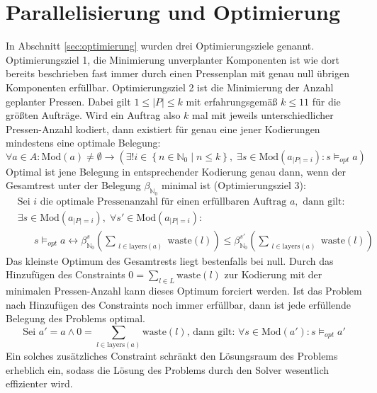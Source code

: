 \section{Parallelisierung und Optimierung}
\label{sec:parallelisierung}
In Abschnitt \ref{sec:optimierung} wurden drei Optimierungsziele genannt.
Optimierungsziel 1, die Minimierung unverplanter Komponenten ist wie dort bereits beschrieben fast immer durch einen Pressenplan mit genau null übrigen Komponenten erfüllbar.
Optimierungsziel 2 ist die Minimierung der Anzahl geplanter Pressen.
Dabei gilt $1 \leq \lvert P \rvert \leq k$ mit erfahrungsgemäß $k \leq 11$ für die größten Aufträge.
Wird ein Auftrag also $k$ mal mit jeweils unterschiedlicher Pressen-Anzahl kodiert, dann existiert für genau eine jener Kodierungen mindestens eine optimale Belegung:
\[
    \forall a \in A: \text{Mod}(a) \neq \emptyset \rightarrow (\exists! i \in \left\{ n \in \mathbb{N}_0 \mid n \leq k \right\}, \; \exists s \in \text{Mod}(a_{\lvert P \rvert = i}): s \models_{opt} a)
\]
Optimal ist jene Belegung in entsprechender Kodierung genau dann, wenn der Gesamtrest unter der Belegung $\beta_{\mathbb{N}_0}$ minimal ist (Optimierungsziel 3):
\begin{align*}
    &\hspace{0pt} \text{Sei } i \text{ die optimale Pressenanzahl für einen erfüllbaren Auftrag } a, \text{ dann gilt:} \\
    &\hspace{0pt} \exists s \in \text{Mod}(a_{\lvert P \rvert = i}), \; \forall s\prime \in \text{Mod}(a_{\lvert P \rvert = i}): \\
    &\hspace{20pt} s \models_{opt} a \leftrightarrow \beta_{\mathbb{N}_0}^{s}\left(\sum\limits_{\substack{l \in \text{layers}(a)}} \text{waste}(l)\right) \leq \beta_{\mathbb{N}_0}^{s\prime}\left( \sum\limits_{\substack{l \in \text{layers}(a)}} \text{waste}(l) \right)
\end{align*}
Das kleinste Optimum des Gesamtrests liegt bestenfalls bei null.
Durch das Hinzufügen des Constraints $0 = \sum_{l \in L} \text{waste}(l)$ zur Kodierung mit der minimalen Pressen-Anzahl
kann dieses Optimum forciert werden.
Ist das Problem nach Hinzufügen des Constraints noch immer erfüllbar, dann ist jede erfüllende Belegung des Problems optimal.
\[
    \text{Sei } a\prime = a \land 0 = \sum_{l \in \text{layers}(a)} \text{waste}(l) \text{, dann gilt: } \forall s \in \text{Mod}(a\prime): s \models_{opt} a\prime
\]
Ein solches zusätzliches Constraint schränkt den Lösungsraum des Problems erheblich ein, sodass die Lösung des Problems durch den Solver wesentlich effizienter wird.

